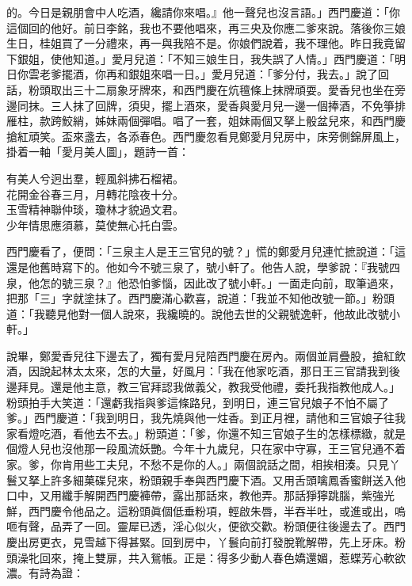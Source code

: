 的。今日是親朋會中人吃酒，纔請你來唱。』他一聲兒也沒言語。」西門慶道：「你這個回的他好。前日李銘，我也不要他唱來，再三央及你應二爹來說。落後你三娘生日，桂姐買了一分禮來，再一與我陪不是。你娘們說着，我不理他。昨日我竟留下銀姐，使他知道。」愛月兒道：「不知三娘生日，我失誤了人情。」西門慶道：「明日你雲老爹擺酒，你再和銀姐來唱一日。」愛月兒道：「爹分付，我去。」說了回話，粉頭取出三十二扇象牙牌來，和西門慶在炕氊條上抹牌頑耍。愛香兒也坐在旁邊同抹。三人抹了回牌，須臾，擺上酒來，愛香與愛月兒一邊一個捧酒，不免箏排雁柱，款跨鮫綃，姊妹兩個彈唱。唱了一套，姐妹兩個又拏上骰盆兒來，和西門慶搶紅頑笑。盃來盞去，各添春色。西門慶忽看見鄭愛月兒房中，床旁側錦屏風上，掛着一軸「愛月美人圖」，題詩一首：

\begin{myquote} 
有美人兮迥出羣，輕風斜拂石榴裙。\\花開金谷春三月，月轉花陰夜十分。\\玉雪精神聯仲琰，瓊林才貌過文君。\\少年情思應須慕，莫使無心托白雲。{}

\end{myquote} 

西門慶看了，便問：「三泉主人是王三官兒的號？」慌的鄭愛月兒連忙摭說道：「這還是他舊時寫下的。他如今不號三泉了，號小軒了。{}他告人說，學爹說：『我號四泉，他怎的號三泉？』他恐怕爹惱，因此改了號小軒。」一面走向前，取筆過來，把那「三」字就塗抹了。西門慶滿心歡喜，{}說道：「我並不知他改號一節。」粉頭道：「我聽見他對一個人說來，我纔曉的。說他去世的父親號逸軒，他故此改號小軒。」

說畢，鄭愛香兒往下邊去了，獨有愛月兒陪西門慶在房內。兩個並肩疊股，搶紅飲酒，因說起林太太來，怎的大量，好風月：「我在他家吃酒，那日王三官請我到後邊拜見。還是他主意，教三官拜認我做義父，教我受他禮，委托我指教他成人。」{}粉頭拍手大笑道：「還虧我指與爹這條路兒，到明日，連三官兒娘子不怕不屬了爹。」{}西門慶道：「我到明日，我先燒與他一炷香。到正月裡，請他和三官娘子往我家看燈吃酒，看他去不去。」粉頭道：「爹，你還不知三官娘子生的怎樣標緻，就是個燈人兒也沒他那一段風流妖艷。今年十九歲兒，只在家中守寡，王三官兒通不着家。{}爹，你肯用些工夫兒，不愁不是你的人。」兩個說話之間，相挨相湊。只見丫鬟又拏上許多細菓碟兒來，粉頭親手奉與西門慶下酒。又用舌頭噙鳳香蜜餅送入他口中，又用纖手解開西門慶褲帶，露出那話來，教他弄。那話猙獰跳腦，紫強光鮮，西門慶令他品之。這粉頭眞個低垂粉項，輕啟朱唇，半吞半吐，或進或出，嗚咂有聲，品弄了一回。靈犀已透，淫心似火，便欲交歡。粉頭便往後邊去了。西門慶出房更衣，見雪越下得甚緊。回到房中，丫鬟向前打發脫靴解帶，先上牙床。粉頭澡牝回來，掩上雙扉，共入鴛帳。正是：得多少動人春色嬌還媚，惹蝶芳心軟欲濃。有詩為證：

